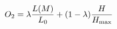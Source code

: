 \documentclass[preview]{standalone}
\begin{document}
\begin{align*}
\special{dvisvgm:raw <g id='unique000'>}O_2 = \lambda\frac{L(M)}{L_0}+(1-\lambda)\frac{H}{H_{\max}}\special{dvisvgm:raw </g>}
\end{align*}
\end{document}
